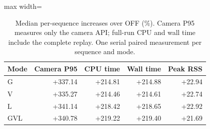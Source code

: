 \begin{table}[tb]
\caption{Median per-sequence increases over OFF (\%). Camera P95 measures only the camera API; full-run CPU and wall time include the complete replay. One serial paired measurement per sequence and mode.}\label{tab:cost}
\centering\small
\begin{adjustbox}{max width=\columnwidth}
\begin{tabular}{lrrrr}
\toprule
Mode & Camera P95 & CPU time & Wall time & Peak RSS \\
\midrule
G & +337.14 & +214.81 & +214.88 & +22.94 \\
V & +335.27 & +214.46 & +214.61 & +22.74 \\
L & +341.14 & +218.42 & +218.65 & +22.92 \\
GVL & +340.78 & +219.22 & +219.40 & +21.69 \\
\bottomrule
\end{tabular}
\end{adjustbox}
\end{table}
